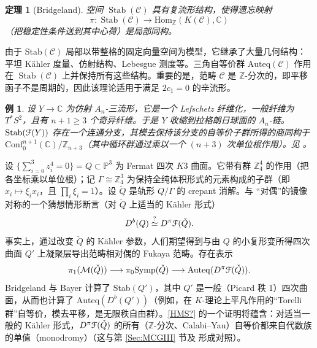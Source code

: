 \documentclass[11pt,a4paper]{article}
\numberwithin{equation}{section}
\newtheorem{Theorem}[thm]{定理}
\newtheorem{Example}[thm]{例}
\newcommand{\bZ}{\mathbb{Z}}
\newcommand{\bC}{\mathbb{C}}
\newcommand{\bP}{\mathbb{P}}
\newcommand{\scrF}{\EuScript{F}}
\newcommand{\Cech}[1]{\check{#1}}
\newcommand{\CC}{\mathcal{C}}
\newcommand{\Symp}{\mathrm{Symp}}
\newcommand{\Hom}{\mathrm{Hom}}
\newcommand{\Auteq}{\mathrm{Auteq}}
\newcommand{\Stab}{\operatorname{Stab}}
\newcommand{\lra}{\longrightarrow}
\begin{document}
\begin{Theorem}[Bridgeland] 
\label{basic}
空间 $\Stab(\CC)$ 具有复流形结构，使得遗忘映射
\[\pi\colon \Stab(\CC)\lra \Hom_{\bZ}(K(\CC),\bC)\]
（把稳定性条件送到其中心荷）是局部同构。
\end{Theorem}

由于 Stab$(\CC)$ 局部以带整格的固定向量空间为模型，它继承了大量几何结构：平坦 Kähler 度量、仿射结构、Lebesgue 测度等。三角自等价群 $\Auteq(\CC)$ 作用在 $\Stab(\CC)$ 上并保持所有这些结构。重要的是，范畴 $\CC$ 是 $\bZ$-分次的，即平移函子不是周期的，因此该理论适用于满足 $2c_1=0$ 的辛流形。


\begin{Example} 
设 $Y \rightarrow \bC$ 为仿射 $A_n$-三流形，它是一个 Lefschetz 纤维化，一般纤维为 $T^*S^2$，且有 $n+1 \geq 3$ 个奇异纤维。于是 $Y$ 收缩到拉格朗日球面的 $A_n$-链。$\mathrm{Stab}(\scrF(Y))$ 存在一个连通分支，其模去保持该分支的自等价子群所得的商同构于 $\mathrm{Conf}_0^{n+1}(\bC) / \bZ_{n+3}$（其中循环群通过乘以一个 $(n+3)$ 次单位根作用）。见 \cite{BridgelandSmith}。\end{Example}

设 $\{\sum_{i=0}^3 z_i^4 = 0\} = Q\subset \bP^3$ 为 Fermat 四次 $K3$ 曲面。它带有群 $\bZ_4^4$ 的作用（把各坐标乘以单位根）；记 $\Gamma \cong \bZ_4^3$ 为保持全纯体积形式的元素构成的子群（即 $x_i \mapsto \xi_i x_i$，且 $\prod_i \xi_i = 1$）。设 $\Cech{Q}$ 是轨形 $Q / \Gamma$ 的 crepant 消解。与 \cite{Seidel:HMSquartic} “对偶”的镜像对称的一个猜想情形断言（对 $\Cech{Q}$ 上适当的 Kähler 形式）
\begin{equation} \label{HMS?}
D^{b}(Q) \stackrel{?}{\simeq} D^{\pi}\scrF(\Cech{Q}).
\end{equation}
事实上，通过改变 $\Cech{Q}$ 的 Kähler 参数，人们期望得到与由 $Q$ 的小复形变所得四次曲面 $Q'$ 上凝聚层导出范畴相对偶的 Fukaya 范畴。存在表示
\[
\pi_1(\mathcal{M}(\Cech{Q})) \longrightarrow \pi_0\Symp(\Cech{Q}) \longrightarrow \Auteq(D^{\pi}\scrF(\Cech{Q})).
\]
Bridgeland 与 Bayer \cite{Bridgeland:K3, BayerBridgeland} 计算了 Stab$(Q')$，其中 $Q'$ 是一般（Picard 秩 1）四次曲面，从而也计算了 $\Auteq(D^b(Q'))$（例如，在 $K$-理论上平凡作用的“Torelli 群”自等价，模去平移，是无限秩自由群）。\eqref{HMS?} 的一个证明将蕴含：对适当一般的 Kähler 形式，$D^{\pi} \scrF(\Cech{Q})$ 的所有（$\bZ$-分次、Calabi--Yau）自等价都来自代数族的单值（monodromy）（这与第 \ref{Sec:MCGIII} 节及 \cite{Smith:HFQuadrics} 形成对照）。
\end{document}
